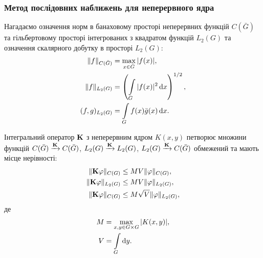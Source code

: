 \subsubsection{Метод послідовних наближень для неперервного ядра}

Нагадаємо означення норм в банаховому просторі неперервних функцій $C(\bar G)$ та гільбертовому просторі інтегрованих з квадратом функцій $L_2(G)$ та означення скалярного добутку в просторі $L_2(G)$:
\begin{align} 
	\label{eq:2.1.1}
	\|f\|_{C(\bar G)} &= \Max_{x \in \bar G} |f(x)|, \\
	\label{eq:2.1.2}
	\|f\|_{L_2(G)} &= \left( \Int_G |f(x)|^2 \diff x \right)^{1/2}, \\
	\label{eq:2.1.3}
	(f, g)_{L_2(G)} &= \Int_G f(x) \bar g(x) \diff x.
\end{align}

\begin{lemma} 
	Інтегральний оператор $\bf{K}$ з неперервним ядром $K(x, y)$ петворює множини функцій $C(\bar G) \xrightarrow{\bf{K}} C(\bar G)$, $L_2(G) \xrightarrow{\bf{K}} L_2(G)$, $L_2(G) \xrightarrow{\bf{K}} C(\bar G)$ обмежений та мають місце нерівності:
	\begin{align}
		\label{eq:2.1.4}
		\| \bf{K} \phi \|_{C(G)} &\le M V \| \phi \|_{C(G)}, \\
		\label{eq:2.1.5}
		\| \bf{K} \phi \|_{L_2(G)} &\le M V \| \phi \|_{L_2(G)}, \\
		\label{eq:2.1.6}
		\| \bf{K} \phi \|_{C(G)} &\le M \sqrt{V} \| \phi \|_{L_2(G)},
	\end{align}
	де
	\begin{align}
		\label{eq:2.1.7}
		M &= \Max_{x, y \in G \times G} |K(x, y)|, \\
		\label{eq:2.1.8}
		V &= \Int_G \diff y.
	\end{align}
\end{lemma}

